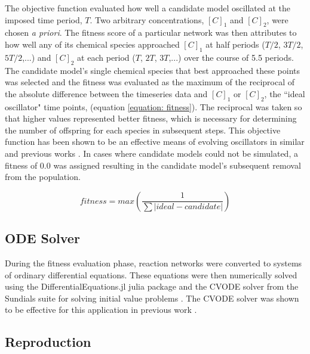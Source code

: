 \documentclass[12pt]{report}
\begin{document}
The objective function evaluated how well a candidate model oscillated at the imposed time period, $T$.  Two arbitrary concentrations, $[C]_{1}$ and $[C]_{2}$,  were chosen \textit{a priori}. The fitness score of a particular network was then attributes to how well any of its chemical species approached $[C]_{1}$ at half periods ($T/2$, $3T/2$, $5T/2$,...) and  $[C]_{2}$ at each period ($T$, $2T$, $3T$,...) over the course of 5.5 periods. The candidate model's single chemical species that best approached these points was selected and the fitness was evaluated as the maximum of the reciprocal of the absolute difference between the timeseries data and $[C]_{1}$ or $[C]_{2}$, the ``ideal oscillator" time points, (equation \ref{equation: fitness}). The reciprocal was taken so that higher values represented better fitness, which is necessary for determining the number of offspring for each species in subsequent steps. This objective function has been shown to be an effective means of evolving oscillators in similar and previous works \cite{Paladugu2006, francois_hakim_2004, Tatka2023}. In cases where candidate models could not be simulated, a fitness of 0.0 was assigned resulting in the candidate model's subsequent removal from the population.

\begin{equation}
\label{equation: fitness}
fitness = max(\frac{1}{\sum|ideal - candidate|})
\end{equation}

\subsection{ODE Solver}
During the fitness evaluation phase, reaction networks were converted to systems of ordinary differential equations. These equations were then numerically solved using the DifferentialEquations.jl julia package \cite{DifferentialEquations.jl-2017} and the CVODE solver from the Sundials suite for solving initial value problems \cite{hindmarsh2005sundials}. The CVODE solver was shown to be effective for this application in previous work \cite{Tatka2023}.

\subsection{Reproduction}
\end{document}
